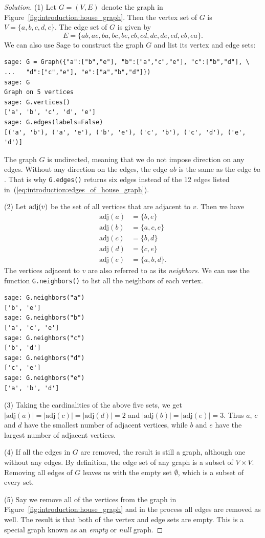 \begin{proof}[Solution]
(1) Let $G = (V, E)$ denote the graph in
Figure~\ref{fig:introduction:house_graph}. Then the vertex set of $G$
is $V = \{ a, b, c, d, e \}$. The edge set of $G$ is given by
\begin{equation}
\label{eq:introduction:edges_of_house_graph}
E
=
\{ ab, ae, ba, bc, be, cb, cd, dc, de, ed, eb, ea \}.
\end{equation}
We can also use Sage to construct the graph $G$ and list its vertex
and edge sets:
%
\begin{lstlisting}
sage: G = Graph({"a":["b","e"], "b":["a","c","e"], "c":["b","d"], \
...   "d":["c","e"], "e":["a","b","d"]})
sage: G
Graph on 5 vertices
sage: G.vertices()
['a', 'b', 'c', 'd', 'e']
sage: G.edges(labels=False)
[('a', 'b'), ('a', 'e'), ('b', 'e'), ('c', 'b'), ('c', 'd'), ('e', 'd')]
\end{lstlisting}
%
The graph $G$ is undirected, meaning that we do not impose direction
on any edges. Without any direction on the edges, the edge $ab$ is the
same as the edge $ba$. That is why \texttt{G.edges()} returns six
edges instead of the 12 edges listed
in~(\ref{eq:introduction:edges_of_house_graph}).

\index{$\adj$}
(2) Let $\operatorname*{adj}(v)$ be the set of all vertices that are adjacent
to $v$. Then we have
%
\begin{align*}
\text{adj}(a) &= \{ b, e \} \\
\text{adj}(b) &= \{ a, c, e \} \\
\text{adj}(c) &= \{ b, d \} \\
\text{adj}(d) &= \{ c, e \} \\
\text{adj}(e) &= \{ a, b, d \}.
\end{align*}
%
The vertices adjacent to $v$ are also referred to as its
\emph{neighbors}. We can use the function \texttt{G.neighbors()} to
list all the neighbors of each vertex.
%
\begin{lstlisting}
sage: G.neighbors("a")
['b', 'e']
sage: G.neighbors("b")
['a', 'c', 'e']
sage: G.neighbors("c")
['b', 'd']
sage: G.neighbors("d")
['c', 'e']
sage: G.neighbors("e")
['a', 'b', 'd']
\end{lstlisting}

(3) Taking the cardinalities of the above five sets, we get
$|\text{adj}(a)| = |\text{adj}(c)| = |\text{adj}(d)| = 2$ and
$|\text{adj}(b)| = |\text{adj}(e)| = 3$. Thus $a$, $c$ and $d$ have
the smallest number of adjacent vertices, while $b$ and $e$ have the
largest number of adjacent vertices.

(4) If all the edges in $G$ are removed, the result is still a graph,
although one without any edges. By definition, the edge set of any
graph is a subset of $V \times V$. Removing all edges of $G$ leaves us
with the empty set $\emptyset$, which is a subset of every set.

(5) Say we remove all of the vertices from the graph in
Figure~\ref{fig:introduction:house_graph} and in the process all edges
are removed as well. The result is that both of the vertex and edge
sets are empty. This is a special graph known as an \emph{empty} or
\emph{null} graph.
\end{proof}

